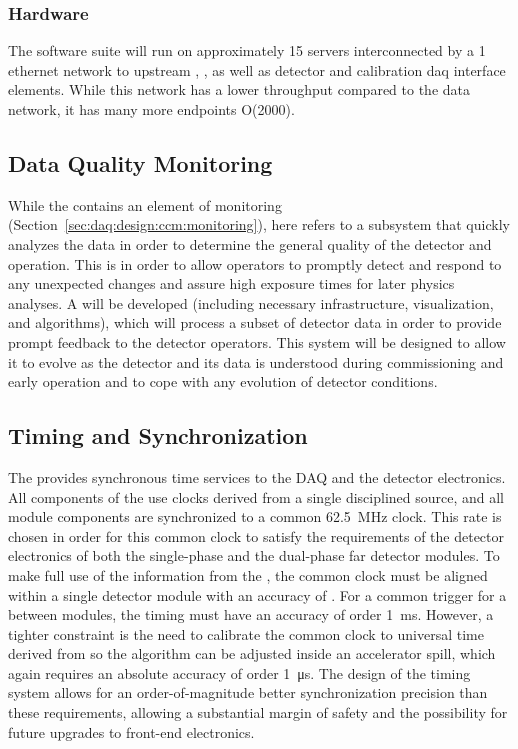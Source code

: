 \subsubsection{Hardware}
\label{sec:daq:design:ccm:hardware}

The  software suite will run on approximately 15 servers interconnected by a \SI{1}{\Gbps} ethernet network to upstream , ,  as well as detector and calibration daq interface elements. While this network has a lower throughput compared to the data network, it has many more endpoints O(2000).

\subsection{Data Quality Monitoring}
\label{sec:fd-daq:design-data-quality}

While the  contains an element of monitoring (Section~\ref{sec:daq:design:ccm:monitoring}), here  refers to a subsystem that quickly analyzes the data in order to determine the general quality of the detector and  operation.
This is in order to allow operators to promptly detect and respond to any unexpected changes and assure high exposure times for later physics analyses. 
A   
will be developed (including necessary infrastructure, visualization,
and algorithms), which will process a subset of detector data in order
to provide prompt feedback to the detector operators. 
This system will be designed to allow it to evolve as the detector and its data is understood during commissioning and early operation and to cope with any evolution of detector conditions.


\subsection{Timing and Synchronization}
\label{sec:sp-daq:design-timing}

The  provides synchronous time services to the DAQ and the detector electronics.
All components of the  use clocks derived from a single
 disciplined source, and all module components are
synchronized to a common \SI{62.5}{MHz} clock.
%
This rate is chosen in order for this common clock to satisfy the requirements of the detector electronics of both the single-phase and the dual-phase far detector modules.
%
To make full use of the information from the , the common clock must be aligned within a single detector 
module with an accuracy of . 
For a common trigger for a  between modules, the timing must have an accuracy of order \SI{1}{\milli\second}.
However, a tighter constraint is the need to calibrate the common clock to universal time derived from  so the  algorithm can be adjusted inside an accelerator spill, which again requires an absolute accuracy of order \SI{1}{\micro\second}. The design of the timing system allows for an order-of-magnitude better synchronization precision than these requirements, allowing a substantial margin of safety and the possibility for future upgrades to front-end electronics.


